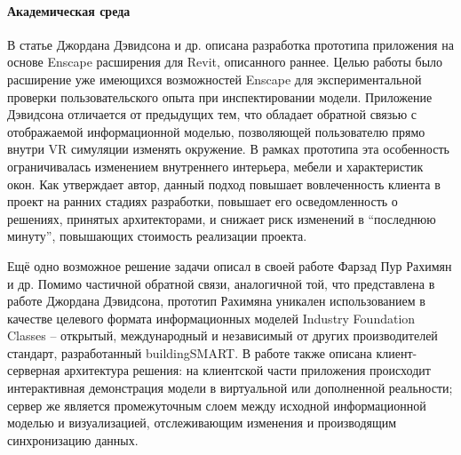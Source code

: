 ﻿\paragraph{Академическая среда}

В статье Джордана Дэвидсона и др. описана разработка прототипа приложения
на основе Enscape расширения для Revit, описанного раннее.%
\cite{Davidson2019}
Целью работы было расширение уже имеющихся возможностей Enscape
для экспериментальной проверки пользовательского опыта при инспектировании модели.
Приложение Дэвидсона отличается от предыдущих тем,
что обладает обратной связью с отображаемой информационной моделью,
позволяющей пользователю прямо внутри VR симуляции изменять окружение.
В рамках прототипа эта особенность ограничивалась изменением
внутреннего интерьера, мебели и характеристик окон.
Как утверждает автор, данный подход повышает вовлеченность
клиента в проект на ранних стадиях разработки,
повышает его осведомленность о решениях, принятых архитекторами,
и снижает риск изменений в ``последнюю минуту'',
повышающих стоимость реализации проекта.

Ещё одно возможное решение задачи описал в своей работе Фарзад Пур Рахимян и др.%
\cite{PourRahimian2019}
Помимо частичной обратной связи, аналогичной той,
что представлена в работе Джордана Дэвидсона,
прототип Рахимяна уникален использованием в качестве целевого формата информационных моделей
Industry Foundation Classes -- открытый, международный и
независимый от других производителей стандарт,
разработанный buildingSMART.%
\cite{BuildingSmartIFC}
В работе также описана клиент-серверная архитектура решения:
на клиентской части приложения происходит интерактивная демонстрация модели
в виртуальной или дополненной реальности;
сервер же является промежуточным слоем между исходной информационной моделью и визуализацией,
отслеживающим изменения и производящим синхронизацию данных.
